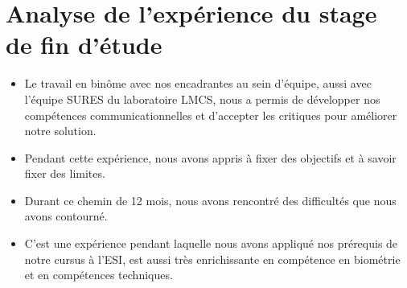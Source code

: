 \section*{Analyse de l'expérience du stage de fin d'étude}
\begin{itemize}
	\item Le travail en binôme avec nos encadrantes au sein d'équipe, aussi avec l'équipe SURES du laboratoire LMCS, nous a permis de développer nos compétences communicationnelles et d'accepter les critiques pour améliorer notre solution.	
	\item Pendant cette expérience, nous avons appris à fixer des objectifs et à savoir fixer des limites.
	\item Durant ce chemin de 12 mois, nous avons rencontré des difficultés que nous avons contourné.
	\item C'est une expérience pendant laquelle nous avons appliqué nos prérequis de notre cursus à l'ESI, est aussi très enrichissante en compétence en biométrie et en compétences techniques.
\end{itemize}


